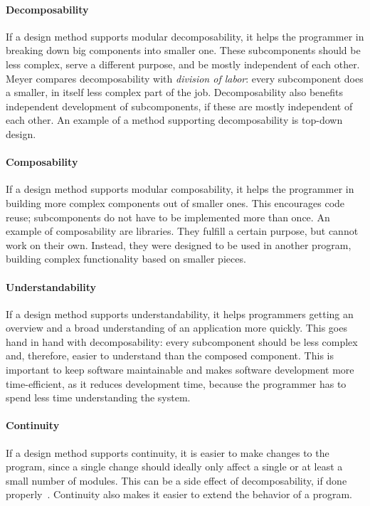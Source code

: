 \paragraph{Decomposability}
If a design method supports modular decomposability, it helps the programmer in breaking down big components into smaller one. These subcomponents should be less complex, serve a different purpose, and be mostly independent of each other. Meyer compares decomposability with \emph{division of labor}: every subcomponent does a smaller, in itself less complex part of the job. Decomposability also benefits independent development of subcomponents, if these are mostly independent of each other. An example of a method supporting decomposability is top-down design.

\paragraph{Composability}
If a design method supports modular composability, it helps the programmer in building more complex components out of smaller ones. This encourages code reuse; subcomponents do not have to be implemented more than once. An example of composability are libraries. They fulfill a certain purpose, but cannot work on their own. Instead, they were designed to be used in another program, building complex functionality based on smaller pieces.

\paragraph{Understandability}
If a design method supports understandability, it helps programmers getting an overview and a broad understanding of an application more quickly. This goes hand in hand with decomposability: every subcomponent should be less complex and, therefore, easier to understand than the composed component. This is important to keep software maintainable and makes software development more time-efficient, as it reduces development time, because the programmer has to spend less time understanding the system.

\paragraph{Continuity}
If a design method supports continuity, it is easier to make changes to the program, since a single change should ideally only affect a single or at least a small number of modules. This can be a side effect of decomposability, if done properly~\cite{Parnas:1972:CUD:361598.361623}. Continuity also makes it easier to extend the behavior of a program.

